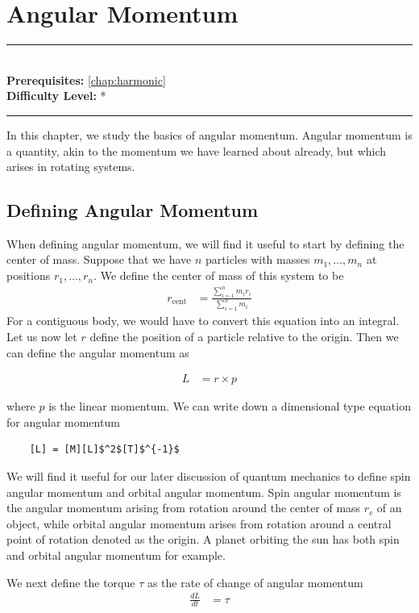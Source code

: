 \documentclass[book.tex]{subfiles}
\begin{document}
\chapter{Angular Momentum}
\label{chap:angular_momentum}
\noindent\rule{11cm}{0.4pt} \\
\textbf{Prerequisites:} \autoref{chap:harmonic} \\
\textbf{Difficulty Level:} * \\
\noindent\rule{11cm}{0.4pt}
\vspace{5mm}

In this chapter, we study the basics of angular momentum. Angular momentum is a quantity, akin to the momentum we have learned about already, but which arises in rotating systems. 


\section{Defining Angular Momentum}
When defining angular momentum, we will find it useful to start by defining the center of mass. Suppose that we have $n$ particles with masses $m_1,\dotsc, m_n$ at positions $r_1,\dotsc,r_n$. We define the center of mass of this system to be
\begin{align}
    r_{\textrm{cent}} &= \frac{\sum_{i=1}^n m_i r_i}{\sum_{i=1}^n m_i}
\end{align}
For a contiguous body, we would have to convert this equation into an integral. Let us now let $r$ define the position of a particle relative to the origin. Then we can define the angular momentum as

\begin{align}
    L &= r \times p
\end{align}

where $p$ is the linear momentum. We can write down a dimensional type equation for angular momentum
\begin{lstlisting}
    [L] = [M][L]$^2$[T]$^{-1}$
\end{lstlisting}

We will find it useful for our later discussion of quantum mechanics to define spin angular momentum and orbital angular momentum. Spin angular momentum is the angular momentum arising from rotation around the center of mass $r_c$ of an object, while orbital angular momentum arises from rotation around a central point of rotation denoted as the origin. A planet orbiting the sun has both spin and orbital angular momentum for example.

We next define the torque $\tau$ as the rate of change of angular momentum
\begin{align}
    \frac{dL}{dt} &= \tau
\end{align}
\end{document}
